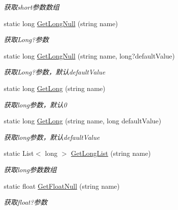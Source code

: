 \begin{DoxyCompactItemize}
\begin{DoxyCompactList}\small\item\em 获取short参数数组 \end{DoxyCompactList}\item 
static long \hyperlink{class_x_c_l_net_tools_1_1_string_hander_1_1_form_helper_abffef0560d4655c00c5bdd3e4ff087cc}{Get\+Long\+Null} (string name)
\begin{DoxyCompactList}\small\item\em 获取\+Long?参数 \end{DoxyCompactList}\item 
static long \hyperlink{class_x_c_l_net_tools_1_1_string_hander_1_1_form_helper_a7e009fc6b804b15f2015d78ed3581677}{Get\+Long\+Null} (string name, long?default\+Value)
\begin{DoxyCompactList}\small\item\em 获取\+Long?参数，默认default\+Value \end{DoxyCompactList}\item 
static long \hyperlink{class_x_c_l_net_tools_1_1_string_hander_1_1_form_helper_a55353bd867fa827c8eb55a710df02cb1}{Get\+Long} (string name)
\begin{DoxyCompactList}\small\item\em 获取long参数，默认0 \end{DoxyCompactList}\item 
static long \hyperlink{class_x_c_l_net_tools_1_1_string_hander_1_1_form_helper_a51392713a245c7460bb5c823eb664ef8}{Get\+Long} (string name, long default\+Value)
\begin{DoxyCompactList}\small\item\em 获取long参数，默认default\+Value \end{DoxyCompactList}\item 
static List$<$ long $>$ \hyperlink{class_x_c_l_net_tools_1_1_string_hander_1_1_form_helper_ac00bef1db952ab0901c1813bbe193fa0}{Get\+Long\+List} (string name)
\begin{DoxyCompactList}\small\item\em 获取long参数数组 \end{DoxyCompactList}\item 
static float \hyperlink{class_x_c_l_net_tools_1_1_string_hander_1_1_form_helper_a6d0d3c455a9582ca4a4fa5bf4269deff}{Get\+Float\+Null} (string name)
\begin{DoxyCompactList}\small\item\em 获取float?参数 \end{DoxyCompactList}\item 

\end{DoxyCompactItemize}
